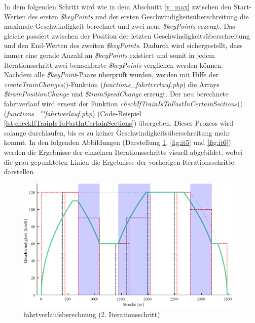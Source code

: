 In dem fol\-gen\-den Schritt wird wie in dem Abschnitt \ref{v_max} zwischen den Start-Werten des ersten \textit{\$keyPoints} und der ersten Geschwindigkeitsüberschreitung die maximale Geschwindigkeit berechnet und zwei neue \textit{\$keyPoints} erzeugt. Das gleiche passiert zwischen der Position der letzten Geschwindigkeitsüberschreitung und den End-Werten des zweiten \textit{\$keyPoints}. Dadurch wird sichergestellt, dass immer eine gerade Anzahl an \textit{\$keyPoints} existiert und somit in jedem Iterationsschritt zwei benachbarte \textit{\$keyPoints} verglichen werden können. Nachdem alle \textit{\$keyPoint}-Paare überprüft wurden, werden mit Hilfe der \textit{create\-Train\-Changes$($$)$}-Funktion (\textit{functions\_fahrtverlauf.php}) die Arrays \textit{\$train\-Position\-Change} und \textit{\$train\-Speed\-Change} erzeugt. Der neu berechnete \Gls{fahrtverlauf} wird erneut der Funktion \textit{check\-If\-Train\-Is\-To\-Fast\-In\-Certain\-Sections$($$)$} (\textit{func\-tions\_""fahrt\-ver\-lauf\-.php}) (Code-Bei\-spiel \ref{lst:checkIfTrainIsToFastInCertainSections}) übergeben. Dieser Prozess wird solange durchlaufen, bis es zu keiner Geschwindigkeitsüberschreitung mehr kommt. In den folgenden Abbildungen (Darstellung \ref{fig:it4}, \ref{fig:it5} und \ref{fig:it6}) werden die Ergebnisse der einzelnen Iterationsschritte visuell abgebildet, wobei die grau gepunkteten Linien die Ergebnisse der vorherigen Iterationsschritte darstellen.
\begin{figure}
\includegraphics[width=\linewidth]{../images/matlab/it4.pdf}
\caption{\Gls{fahrtverlauf}sberechnung (2. Iterationsschritt)}
\label{fig:it4}
\end{figure}
